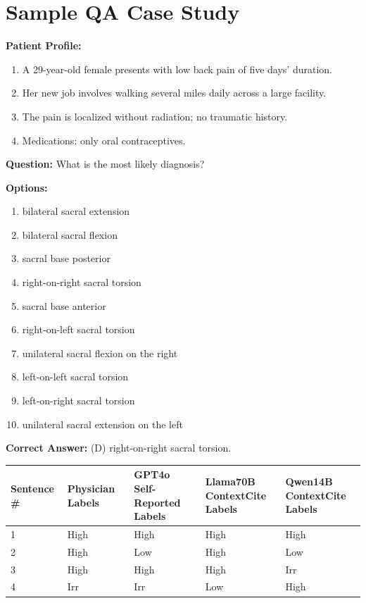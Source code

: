 \documentclass[11pt]{article}
\begin{document}
\clearpage
\clearpage
\section{Sample QA Case Study}
\label{sample}
\begin{tcolorbox}[colback=blue!3!white, colframe=blue!50!white,
                  title=Example of QA Data (from MedXpert QA ID0071), left=10mm, breakable]
\small

\textbf{Patient Profile:}
\begin{enumerate}
  \item A 29-year-old female presents with low back pain of five days’ duration.
  \item Her new job involves walking several miles daily across a large facility.
  \item The pain is localized without radiation; no traumatic history.
  \item Medications: only oral contraceptives.
\end{enumerate}

\bigskip
\textbf{Question: }What is the most likely diagnosis?

\bigskip
\textbf{Options:}
\begin{enumerate}[label=\Alph*.]
  \item bilateral sacral extension  
  \item bilateral sacral flexion  
  \item sacral base posterior  
  \item right-on-right sacral torsion  
  \item sacral base anterior  
  \item right-on-left sacral torsion  
  \item unilateral sacral flexion on the right  
  \item left-on-left sacral torsion  
  \item left-on-right sacral torsion  
  \item unilateral sacral extension on the left  
\end{enumerate}

\bigskip
\textbf{Correct Answer:} (D) right-on-right sacral torsion.

\bigskip
\noindent
\label{tab:label_landscape_comparison}

\medskip
\centering
\setlength{\tabcolsep}{4pt}
\begin{tabular}{|l|l|l|l|l|}
  \toprule
  Sentence \# & Physician Labels & \makecell[c]{GPT4o \\ Self-Reported Labels} & \makecell[c]{Llama70B \\ContextCite Labels}  & \makecell[c]{Qwen14B \\ContextCite Labels} \\
  \midrule
  1 & High & High & High & High\\
  2 & High  & Low  & High & Low\\
  3 & High  & High & High & Irr\\
  4 & Irr  & Irr  & Low  & High\\   
  \bottomrule         
\end{tabular}
\end{tcolorbox}
\end{document}
